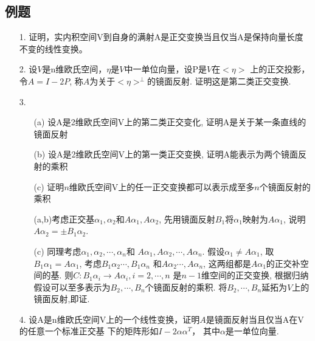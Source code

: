 \subsection{例题}
\begin{itemize}
    \item[1.] 证明，实内积空间V到自身的满射A是正交变换当且仅当A是保持向量长度不变的线性变换。
    \vspace{2cm}

    \item[2.] 设$V$是n维欧氏空间，$\eta$是$V$中一单位向量，设P是$V$在$<\eta>$
    上的正交投影，令$A=I-2P$, 称$A$为关于$<\eta>^{\perp}$的镜面反射. 证明这是第二类正交变换. 
    \vspace{2cm}

    \item[3.] 
    \begin{itemize}
        \item [(a)] 设A是2维欧氏空间V上的第二类正交变化, 证明A是关于某一条直线的镜面反射
        \item [(b)] 设A是2维欧氏空间V上的第一类正交变换, 证明A能表示为两个镜面反射的乘积
        \item [(c)] 证明$n$维欧氏空间V上的任一正交变换都可以表示成至多$n$个镜面反射的乘积
        
        \begin{solution}
            (a,b)考虑正交基$\alpha_1, \alpha_2$和$A \alpha_1, A \alpha_2$,
            先用镜面反射$B_1$将$\alpha_1$映射为$A\alpha_1$, 说明$A\alpha_2 = \pm B_1\alpha_2$.
            
            (c) 同理考虑$\alpha_1, \alpha_2,\cdots, \alpha_n$和
            $A\alpha_1, A\alpha_2,\cdots, A\alpha_n$. 假设$\alpha_1 \ne A\alpha_1$,
            取$B_1 \alpha_1 = A\alpha_1$, 考虑$B_1 \alpha_2 \cdots, B_1\alpha_n$
            和$A \alpha_2 \cdots, A\alpha_n$, 这两组都是$A \alpha_1$的正交补空间的基.
            则$C: B_1\alpha_i \rightarrow A\alpha_i, i=2,\cdots, n$
            是$n-1$维空间的正交变换, 根据归纳假设可以至多表示为$B_2,\cdots, B_n$个镜面反射的乘积.
            将$B_2,\cdots, B_n$延拓为$V$上的镜面反射,即证.
        \end{solution}
    \end{itemize}
    
    \item[4.] 设A是n维欧氏空间V上的一个线性变换，证明$A$是镜面反射当且仅当A在V的任意一个标准正交基
    下的矩阵形如$I-2\alpha \alpha^T$， 其中$\alpha$是一单位向量.
    \vspace{3cm}


\end{itemize}

